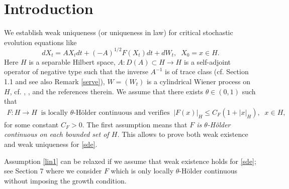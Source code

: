\documentclass[preprint]{imsart}
\begin{document}
    
 
  
 \startlocaldefs
{}
\theoremstyle{plain}
\newtheorem{thm}{Theorem}[section]
\endlocaldefs  
 
\section{Introduction} 



 
We establish weak uniqueness (or uniqueness in law)    for critical  stochastic evolution equations like 
\begin{equation} \label{sde}
dX_t = AX_t dt + (-A)^{1/2}F(X_t)dt +  dW_t, \;\; X_0 =x \in H.
\end{equation}   
Here $H$ is a separable Hilbert space, $ A: D(A) \subset H \to H$ is a 
self-adjoint operator of negative type 
such that the inverse $A^{-1}$ is of trace class (cf. Section 1.1 and see also Remark \ref{serve}), $W = (W_t)$ is a cylindrical Wiener process on  $H$, cf.  \cite{DZ1},    \cite{DZ},  \cite{hairer}     and the references therein. We    assume that
there exists $\theta \in (0,1)$ such that 
\begin{eqnarray} \label{lin1} 
F: H \to H \;\; \text{is locally $\theta$-H\"older continuous }
 \text{and verifies}   
\;\; |F(x)|_H \le C_F (1 + |x|_H),  \;\; x \in H,
\end{eqnarray}   
   for some  constant $C_F >0$. The first assumption means that 
 {\sl $F$ is $\theta$-H\"older continuous  on each bounded set of $H$.} 
    This allows to prove  both weak existence and weak uniqueness for \eqref{sde}.
  
 
   Assumption \eqref{lin1} can be   relaxed if we assume  that  weak existence holds for \eqref{sde}; 
  see Section 7 
  where we 
  consider  $F$ which is   only  locally  $\theta$-H\"older continuous   %
 without imposing the  growth condition.
 
\end{document}
